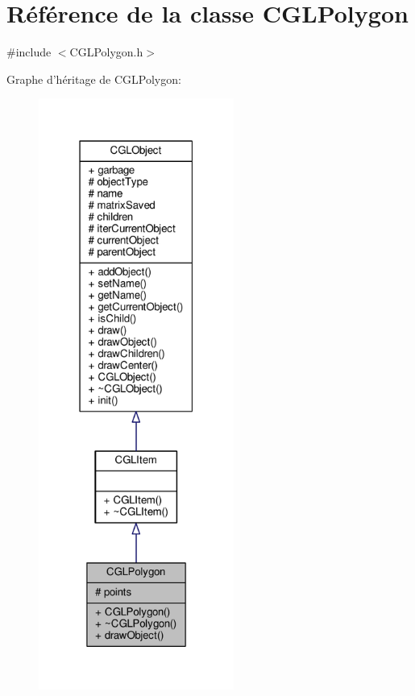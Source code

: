 \hypertarget{class_c_g_l_polygon}{\section{Référence de la classe C\-G\-L\-Polygon}
\label{class_c_g_l_polygon}
}


{\ttfamily \#include $<$C\-G\-L\-Polygon.\-h$>$}



Graphe d'héritage de C\-G\-L\-Polygon\-:\nopagebreak
\begin{figure}[H]
\begin{center}
\leavevmode
\includegraphics[height=550pt]{d9/d48/class_c_g_l_polygon__inherit__graph}
\end{center}
\end{figure}


